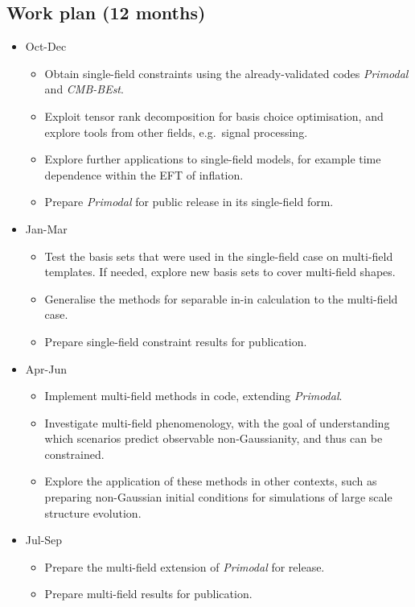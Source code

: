 \subsection{Work plan (12 months)}
\begin{itemize}
	\item Oct-Dec
	\begin{itemize}
        \item Obtain single-field constraints using the already-validated codes \textit{Primodal} and \textit{CMB-BEst}.
        \item Exploit tensor rank decomposition for basis choice optimisation, and explore tools from other fields, e.g.~signal processing.
        \item Explore further applications to single-field models, for example time dependence within the EFT of inflation.
        \item Prepare \textit{Primodal} for public release in its single-field form.
	\end{itemize}
	\item Jan-Mar
	\begin{itemize}
        \item Test the basis sets that were used in the single-field case on multi-field templates.
            If needed, explore new basis sets to cover multi-field shapes.
        \item Generalise the methods for separable in-in calculation to the multi-field case.
        \item Prepare single-field constraint results for publication.
	\end{itemize}
	\item Apr-Jun
	\begin{itemize}
        \item Implement multi-field methods in code, extending \textit{Primodal}.
        \item Investigate multi-field phenomenology, with the goal of understanding which scenarios predict observable non-Gaussianity, and thus can be constrained.
        \item Explore the application of these methods in other contexts, such as preparing non-Gaussian initial conditions for simulations of large scale structure evolution.
	\end{itemize}
	\item Jul-Sep
	\begin{itemize}
        \item Prepare the multi-field extension of \textit{Primodal} for release.
        \item Prepare multi-field results for publication.
	\end{itemize}
\end{itemize}

